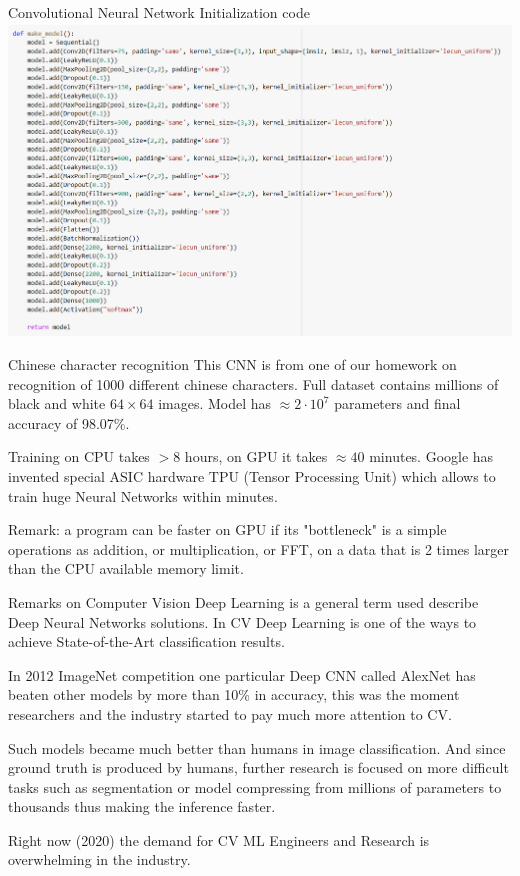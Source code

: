 \documentclass{beamer}
\theoremstyle{remark}
\begin{document}
\begin{frame}{Convolutional Neural Network Initialization code}
    \includegraphics[width=\textwidth]{pictures/CNN_code.png}
\end{frame}

\begin{frame}{Chinese character recognition}
    This CNN is from one of our homework on recognition of 1000 different chinese characters. Full dataset contains millions of black and white $64\times 64$ images. Model has $\approx 2\cdot 10^7$ parameters and final accuracy of 98.07\%.\vspace{0.1in}
    
    Training on CPU takes $>8$ hours, on GPU it takes $\approx 40$ minutes. Google has invented special ASIC hardware TPU (Tensor Processing Unit) which allows to train huge Neural Networks within minutes.\vspace{0.1in}
    
    Remark: a program can be faster on GPU if its "bottleneck" is a simple operations as addition, or multiplication, or FFT, on a data that is 2 times larger than the CPU available memory limit.
\end{frame}

\begin{frame}{Remarks on Computer Vision}
    Deep Learning is a general term used describe Deep Neural Networks solutions. In CV Deep Learning is one of the ways to achieve State-of-the-Art classification results.\vspace{0.1in}
    
    In 2012 ImageNet competition one particular Deep CNN called AlexNet has beaten other models by more than 10\% in accuracy, this was the moment researchers and the industry started to pay much more attention to CV.\vspace{0.1in}
    
    Such models became much better than humans in image classification. And since ground truth is produced by humans, further research is focused on more difficult tasks such as segmentation or model compressing from millions of parameters to thousands thus making the inference faster.\vspace{0.1in}
    
    Right now (2020) the demand for CV ML Engineers and Research is overwhelming in the industry.
\end{frame}
\end{document}
